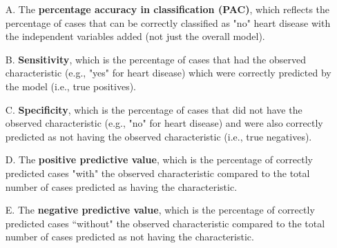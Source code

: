 \documentclass[12pt]{article}
\begin{document}
\begin{itemize}
\item[A.] The \textbf{percentage accuracy in classification (PAC)}, which reflects the percentage of cases that can be correctly classified as "no" heart disease with the independent variables added (not just the overall model).
\item[B.] \textbf{Sensitivity}, which is the percentage of cases that had the observed characteristic (e.g., "yes" for heart disease) which were correctly predicted by the model (i.e., true positives).
\item[C.] \textbf{Specificity}, which is the percentage of cases that did not have the observed characteristic (e.g., "no" for heart disease) and were also correctly predicted as not having the observed characteristic (i.e., true negatives).
\item[D.] The \textbf{positive predictive value}, which is the percentage of correctly predicted cases "with" the observed characteristic compared to the total number of cases predicted as having the characteristic.
\item[E.] The \textbf{negative predictive value}, which is the percentage of correctly predicted cases ``without" the observed characteristic compared to the total number of cases predicted as not having the characteristic.
\end{itemize}
\end{document}
